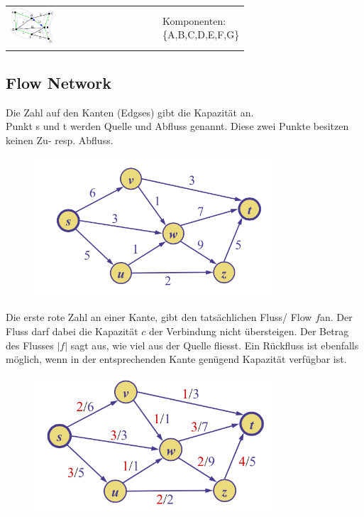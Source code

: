 \documentclass[a4paper,10pt]{report}
\begin{document}
\begin{enumerate}
		\begin{tabularx}{\textwidth}{XX}
			\vspace{-0.5cm}
			\includegraphics[width=0.3\textwidth]{img/baruvka3.png}
			&
			\pbox{0.3\textwidth}{
			Komponenten:\\
			\{A,B,C,D,E,F,G\}
			}
		\end{tabularx}
\end{enumerate}
\newpage
\subsection{Flow Network}
Die Zahl auf den Kanten (Edgses) gibt die Kapazität an.\\
Punkt s und t werden Quelle und Abfluss genannt. Diese zwei Punkte besitzen keinen Zu- resp. Abfluss.
\begin{figure}[H]
	\begin{center}
  		\includegraphics[width=0.8\textwidth]{img/flow.png}
	\end{center}
\end{figure}
\noindent
Die erste rote Zahl an einer Kante, gibt den tatsächlichen Fluss/ Flow $f$an. Der Fluss darf dabei die Kapazität $c$ der Verbindung nicht übersteigen. Der Betrag des Flusses $|f|$ sagt aus, wie viel aus der Quelle fliesst. Ein Rückfluss ist ebenfalls möglich, wenn in der entsprechenden Kante genügend Kapazität verfügbar ist.
\begin{figure}[H]
	\begin{center}
  		\includegraphics[width=0.8\textwidth]{img/flow2.png}
	\end{center}
\end{figure}
\newpage
\end{document}
